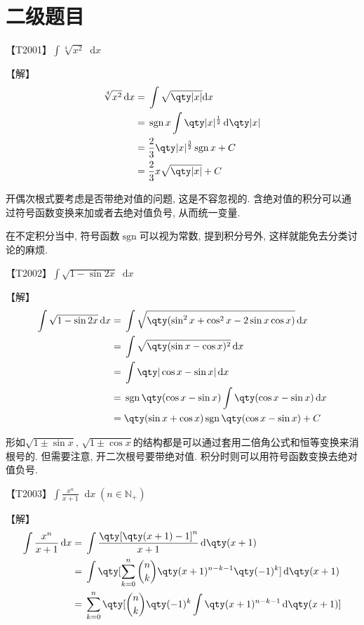 \documentclass{ctexbook}
\DeclareMathOperator{\sgn}{sgn}
\newcommand*{\dif}{\mathop{}\!\mathrm{d}}
\begin{document}
{\chapter*{二级题目}
{\color{red}【T2001】}$\int\sqrt[4]{x^{2}}\dif{x}$\par
【解】
\begin{align*}
\sqrt[4]{x^{2}}\dif{x}={}&\int\sqrt{\qty|x|}{\dif{x}}\\
={}&\sgn{x}\int\qty|x|^{\frac{1}{2}}\dif{\qty|x|}\\
={}&\frac{2}{3}\qty|x|^{\frac{3}{2}}\sgn{x}+C\\
={}&\frac{2}{3}x\sqrt{\qty|x|}+C
\end{align*}\par
{\kaishu 开偶次根式要考虑是否带绝对值的问题, 这是不容忽视的. 含绝对值的积分可以通过符号函数变换来加或者去绝对值负号, 从而统一变量. \par
在不定积分当中, 符号函数$\sgn$可以视为常数, 提到积分号外, 这样就能免去分类讨论的麻烦. \par}
{\color{red}【T2002】}$\int\sqrt{1-\sin{2x}}\dif{x}$\par
【解】
\begin{align*}
\int\sqrt{1-\sin{2x}}\dif{x}={}&\int\sqrt{\qty(\sin^{2}{x}+\cos^{2}{x}-2\sin{x}\cos{x})}\dif{x}\\
={}&\int\sqrt{\qty(\sin{x}-\cos{x})^{2}}\dif{x}\\
={}&\int\qty|\cos{x}-\sin{x}|\dif{x}\\
={}&\sgn{\qty(\cos{x}-\sin{x})}\int\qty(\cos{x}-\sin{x})\dif{x}\\
={}&\qty(\sin{x}+\cos{x})\sgn{\qty(\cos{x}-\sin{x})}+C
\end{align*}\par
{\kaishu 形如$\sqrt{1\pm\sin{x}},\,\sqrt{1\pm\cos{x}}$的结构都是可以通过套用二倍角公式和恒等变换来消根号的. 但需要注意, 开二次根号要带绝对值. 积分时则可以用符号函数变换去绝对值负号. \par}
【T2003】$\int\frac{x^{n}}{x+1}\dif{x}\;\left(n\in\mathbb{N_{+}}\right)$\par
【解】
\begin{align*}
\int\frac{x^{n}}{x+1}\dif{x}={}&\int\frac{\qty[\qty(x+1)-1]^{n}}{x+1}\dif{\qty(x+1)}\\
={}&\int\qty[\sum_{k=0}^{n}\binom{n}{k}\qty(x+1)^{n-k-1}\qty(-1)^{k}]\dif{\qty(x+1)}\\
={}&\sum_{k=0}^{n}\qty[\binom{n}{k}\qty(-1)^{k}\int\qty(x+1)^{n-k-1}\dif{\qty(x+1)}]\\

\end{align*}}
\end{document}
